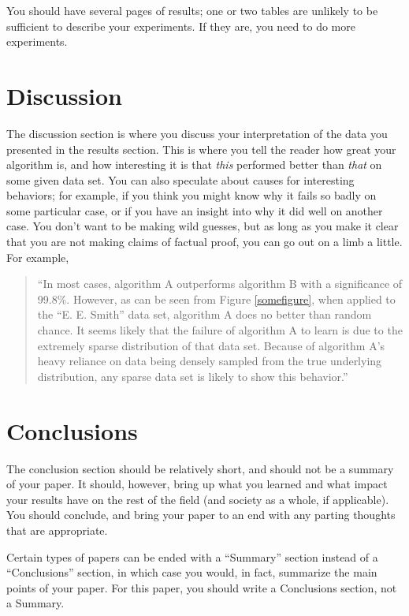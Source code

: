 \documentclass[12pt, letterpaper]{article}
\begin{document}
You should have several pages of results; one or two tables are unlikely to be
sufficient to describe your experiments.  If they are, you need to do more
experiments.

\section{Discussion}
The discussion section is where you discuss your interpretation of the data you
presented in the results section.  This is where you tell the reader how great
your algorithm is, and how interesting it is that \emph{this} performed better
than \emph{that} on some given data set.  You can also speculate about causes
for interesting behaviors; for example, if you think you might know why it fails
so badly on some particular case, or if you have an insight into why it did well
on another case.  You don't want to be making wild guesses, but as long as you
make it clear that you are not making claims of factual proof, you can go out on
a limb a little.  For example,

\begin{quote}
``In most cases, algorithm A outperforms algorithm B with a significance of
99.8\%.  However, as can be seen from Figure \ref{somefigure}, when applied to
the ``E. E. Smith'' data set, algorithm A does no better than random chance.  It
seems likely that the failure of algorithm A to learn is due to the extremely
sparse distribution of that data set.  Because of algorithm A's heavy reliance
on data being densely sampled from the true underlying distribution, any sparse
data set is likely to show this behavior.''
\end{quote}

\section{Conclusions}
The conclusion section should be relatively short, and should not be a summary
of your paper.  It should, however, bring up what you learned and what impact
your results have on the rest of the field (and society as a
whole, if applicable).  You should conclude, and bring your paper to an  end
with any parting thoughts that are appropriate.

Certain types of papers can be ended with a ``Summary'' section instead of a
``Conclusions'' section, in which case you would, in fact, summarize the main
points of your paper.  For this paper, you should write a Conclusions section,
not a Summary.
\end{document}
